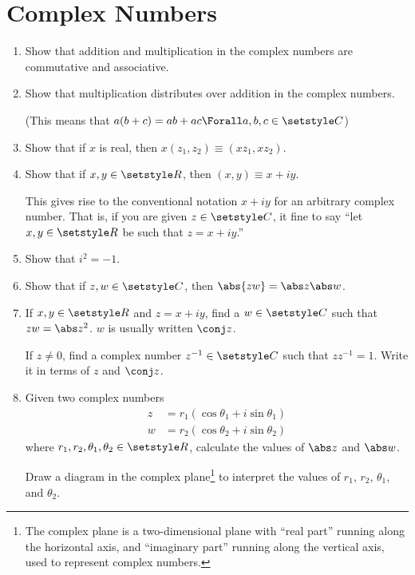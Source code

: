 \section{Complex Numbers}

\begin{enumerate}
 \item
  Show that addition and multiplication in the complex numbers are commutative
  and associative.
 \item
  Show that multiplication distributes over addition in the complex numbers.

  (This means that \(a(b + c) = ab + ac \Forall a, b, c \in \Complex\))
 \item
  Show that if \(x\) is real, then \(x(z_1, z_2) \equiv (x z_1, x z_2)\).
 \item
  Show that if \(x, y \in \Reals\), then \((x, y) \equiv x + i y\).

  This gives rise to the conventional notation \(x + iy\) for an arbitrary
  complex number. That is, if you are given \(z \in \Complex\), it fine to say
  ``let \(x, y \in \Reals\) be such that \(z = x + iy\).''
 \item
  Show that \(i^2 = -1\).
 \item
  Show that if \(z, w \in \Complex\), then \(\abs{zw} = \abs z \abs w\).
 \item
  If \(x, y \in \Reals\) and \(z = x + iy\), find a \(w \in \Complex\) such that
  \(zw = \abs z^2\). \(w\) is usually written \(\conj z\).

  If \(z \ne 0\), find a complex number \(z^{-1} \in \Complex\) such that
  \(zz^{-1} = 1\). Write it in terms of \(z\) and \(\conj z\).
 \item \label{q_compl_args}
  Given two complex numbers
  \begin{align*}
   z &= r_1(\cos \theta_1 + i \sin \theta_1) \\
   w &= r_2(\cos \theta_2 + i \sin \theta_2)
  \end{align*}
  where \(r_1, r_2, \theta_1, \theta_2 \in \Reals\),
  calculate the values of \(\abs z\) and \(\abs w\).

  Draw a diagram in the complex plane\footnote{
   The complex plane is a two-dimensional plane with ``real part'' running along
   the horizontal axis, and ``imaginary part'' running along the vertical axis,
   used to represent complex numbers.
  } to interpret the values of \(r_1\), \(r_2\), \(\theta_1\), and \(\theta_2\).


\end{enumerate}
